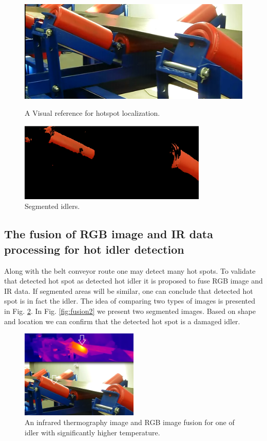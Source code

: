 \documentclass[3p,times,12pt]{elsarticle}
\begin{document}
\begin{figure}
\centering
\begin{minipage}[c]{0.48\textwidth}
\centering

\includegraphics[width=0.6 \textwidth]{yyy.png}
	\caption{A Visual reference for hotspot localization.}
	\label{fig:yyy}


\end{minipage}
\hfill
\begin{minipage}[c]{0.48\textwidth}
\centering
\includegraphics[width=0.8\textwidth]{yyy2.png}
	\caption{Segmented idlers.}
	\label{fig:yyy2}
	
\end{minipage}
\end{figure}




\subsection{The fusion of RGB image  and IR data processing for hot idler detection}
Along with the belt conveyor route one may detect many hot spots. To validate that detected hot spot as detected hot idler it is proposed to fuse RGB image and IR data. If segmented areas will be similar, one can conclude that detected hot spot is in fact the idler.
The idea of comparing two types of images is presented in Fig. \ref{fig:IRRGBfusion}.
In Fig. \ref{fig:fusion2} we present two segmented images. Based on shape and location we can confirm that the detected hot spot is a damaged idler.

\begin{figure}[ht!]
	\centering
	\includegraphics[width=0.5\textwidth]{IR_RGB fusion.png}
	\caption{An infrared thermography image and RGB image fusion for one of idler with significantly higher temperature.}
	\label{fig:IRRGBfusion}
\end{figure}
\end{document}
